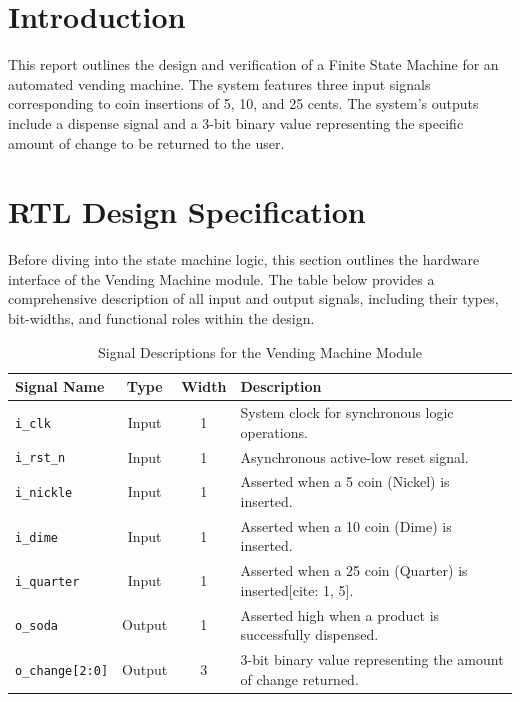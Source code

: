 

\section{Introduction}
This report outlines the design and verification of a Finite State Machine for an automated vending machine. The system features three input signals corresponding to coin insertions of 5, 10, and 25 cents. The system's outputs include a dispense signal and a 3-bit binary value representing the specific amount of change to be returned to the user.

\section{RTL Design Specification}

Before diving into the state machine logic, this section outlines the hardware interface of the Vending Machine module. The table below provides a comprehensive description of all input and output signals, including their types, bit-widths, and functional roles within the design.

\begin{table}[H]
	\centering
	
	\label{tab:signals}
	\renewcommand{\arraystretch}{1.4}
	\begin{tabularx}{\textwidth}{|l|c|c|X|}
		\hline
		\textbf{Signal Name} & \textbf{Type} & \textbf{Width} & \textbf{Description} \\ \hline
		\texttt{i\_clk} & Input & 1 & System clock for synchronous logic operations. \\ \hline
		\texttt{i\_rst\_n} & Input & 1 & Asynchronous active-low reset signal. \\ \hline
		\texttt{i\_nickle} & Input & 1 & Asserted when a 5\textcent{} coin (Nickel) is inserted. \\ \hline
		\texttt{i\_dime} & Input & 1 & Asserted when a 10\textcent{} coin (Dime) is inserted. \\ \hline
		\texttt{i\_quarter} & Input & 1 & Asserted when a 25\textcent{} coin (Quarter) is inserted[cite: 1, 5]. \\ \hline
		\texttt{o\_soda} & Output & 1 & Asserted high when a product is successfully dispensed. \\ \hline
		\texttt{o\_change[2:0]} & Output & 3 & 3-bit binary value representing the amount of change returned. \\ \hline
	\end{tabularx}
	\caption{Signal Descriptions for the Vending Machine Module}
\end{table}



